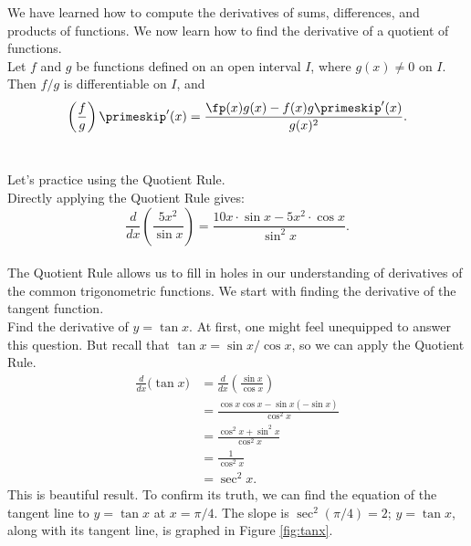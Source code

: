 We have learned how to compute the derivatives of sums, differences, and products of functions. We now learn how to find the derivative of a quotient of functions.\\

{Let $f$ and $g$ be functions defined on an open interval $I$, where $g(x) \neq 0$ on $I$. Then $f/g$ is differentiable on $I$, and 
\[
\left(\frac{f}{g}\right)\primeskip'(x) = \frac{\fp(x)g(x) - f(x)g\primeskip'(x)}{g(x)^2}.
\]
}\\


Let's practice using the Quotient Rule.\\

{Directly applying the Quotient Rule gives:
	\[
	\frac{d}{dx}\left(\frac{5x^2}{\sin x}\right) = \frac{10x\cdot\sin x - 5x^2\cdot \cos x}{\sin^2x}.
	\]
\baselineskip
}\\

The Quotient Rule allows us to fill in holes in our understanding of derivatives of the common trigonometric functions. We start with finding the derivative of the tangent function.\\

{Find the derivative of $y=\tan x$.}
{At first, one might feel unequipped to answer this question. But recall that $\tan x = \sin x/\cos x$, so we can apply the Quotient Rule.
		\begin{align*}
		\frac{d}{dx}\Big(\tan x\Big) &= \frac{d}{dx}\left(\frac{\sin x}{\cos x}\right) \\
																	&=	\frac{\cos x \cos x - \sin x (-\sin x)}{\cos^2 x} \\
																	&= \frac{\cos^2x+\sin^2x}{\cos^2x}\\
																	&= \frac{1}{\cos^2x} \\
																	&= \sec ^2 x.
		\end{align*}
This is beautiful result. To confirm its truth, we can find the equation of the tangent line to $y=\tan x$ at $x=\pi/4$. The slope is $\sec^2(\pi/4) = 2$; $y=\tan x$, along with its tangent line, is graphed in Figure \ref{fig:tanx}.
}\\

